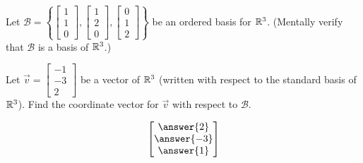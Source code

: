 \documentclass{ximera}
\author{}
\begin{document}
\begin{exercise}
Let $\mathcal{B}=\left\{ \begin{bmatrix}1\\1\\0\end{bmatrix}, \begin{bmatrix}1\\2\\0\end{bmatrix}, \begin{bmatrix}0\\1\\2\end{bmatrix}\right\}$ be an ordered basis for $\mathbb{R}^3$.  (Mentally verify that $\mathcal{B}$ is a basis of $\mathbb{R}^3$.)

Let $\vec{v}=\begin{bmatrix}-1\\-3\\2\end{bmatrix}$ be a vector of $\mathbb{R}^3$ (written with respect to the standard basis of $\mathbb{R}^3$).
Find the coordinate vector for $\vec{v}$ with respect to $\mathcal{B}$.

$$\begin{bmatrix}\answer{2}\\\answer{-3}\\\answer{1}\end{bmatrix}$$
\end{exercise}
\end{document}
